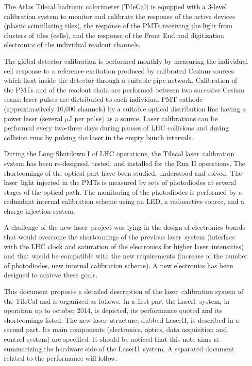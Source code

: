 \documentclass[UKenglish,texlive=2013]{\ATLASLATEXPATH atlasdoc}
\newcommand{\laser}{laser}
\newcommand{\lasi}{{\sc LaserI}}
\newcommand{\lasii}{{\sc LaserII}}
\begin{document}
The Atlas Tilecal hadronic calorimeter (TileCal) \cite{ref:tilecal} is equipped with a 3-level calibration system to monitor and  calibrate the response of the active devices (plastic scintillating tiles), the response of the PMTs receiving the light from clusters of tiles (cells), and the response of the Front End and digitization electronics of the individual readout channels. \par
The global detector calibration is performed monthly by measuring the individual cell response to a reference excitation produced by calibrated Cesium sources which float inside the detector through a suitable pipe network.
Calibration of the PMTs and of the readout chain are performed between two sucessive Cesium scans; laser pulses are distributed to each individual PMT cathode (approximatively 10,000 channels) by a suitable optical distribution line having a power laser (several $\mu$J per pulse) as a source. Laser calibrations can be performed every two-three days during pauses of LHC collisions and during collision runs by pulsing the laser in the empty bunch intervals.  \par
During the Long Shutdown I of LHC operations, the Tilecal \laser~calibration system has been re-designed, tested, and installed for the Run II operations. The shortcomings of the optical part have been studied, understood and solved. The \laser~light injected in the PMTs is measured by sets of photodiodes at several stages of the optical path. The monitoring of the photodiodes is performed by a redundant internal calibration scheme using an LED, a radioactive source, and a charge injection system. \par
A challenge of the new \laser~project was lying in the design of electronics boards that would overcome the shortcomings of the previous \laser~system (interface with the LHC clock and saturation of the electronics for higher \laser~intensities) and that would be compatible with the new requirements (increase of the number of photodiodes, new internal calibration scheme). A new electronics has been designed to achieve these goals.\par
This document proposes a detailed description of the \laser~calibration system of the TileCal and is organized as follows. In a first part the \lasi~system, in operation up to october 2014, is depicted, its performance quoted and its shortcomings listed. The new \laser~structure, dubbed \lasii, is described in a second part. Its main components (electronics, optics, data acquisition and control system) are specified. It should be noticed that this note aims at summarizing the hardware side of the \lasii~system. A separated document related to the performance will follow. 
\end{document}
